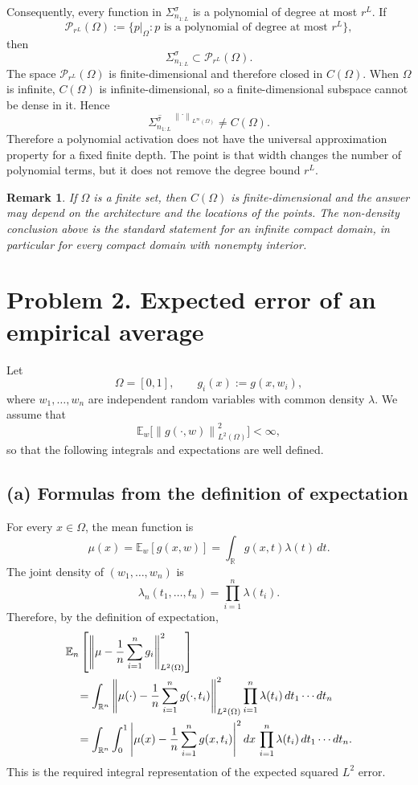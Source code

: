 \documentclass[11pt]{article}
\newtheorem*{remark}{Remark}
\newcommand{\R}{\mathbb{R}}
\newcommand{\E}{\mathbb{E}}
\newcommand{\norm}[1]{\left\lVert #1\right\rVert}
\begin{document}
Consequently, every function in $\Sigma_{n_{1:L}}^\sigma$ is a polynomial of
degree at most $r^L$. If
\[
  \mathcal P_{r^L}(\Omega)
  :=\{p|_\Omega:p\text{ is a polynomial of degree at most }r^L\},
\]
then
\[
  \Sigma_{n_{1:L}}^\sigma\subset \mathcal P_{r^L}(\Omega).
\]
The space $\mathcal P_{r^L}(\Omega)$ is finite-dimensional and therefore closed
in $C(\Omega)$. When $\Omega$ is infinite, $C(\Omega)$ is infinite-dimensional,
so a finite-dimensional subspace cannot be dense in it. Hence
\[
  \overline{\Sigma_{n_{1:L}}^\sigma}^{\,\norm{\cdot}_{L^\infty(\Omega)}}
  \ne C(\Omega).
\]
Therefore a polynomial activation does not have the universal approximation
property for a fixed finite depth. The point is that width changes the number
of polynomial terms, but it does not remove the degree bound $r^L$.

\begin{remark}
If $\Omega$ is a finite set, then $C(\Omega)$ is finite-dimensional and the
answer may depend on the architecture and the locations of the points. The
non-density conclusion above is the standard statement for an infinite compact
domain, in particular for every compact domain with nonempty interior.
\end{remark}

\section*{Problem 2. Expected error of an empirical average}

Let
\[
  \Omega=[0,1],
  \qquad
  g_i(x):=g(x,w_i),
\]
where $w_1,\ldots,w_n$ are independent random variables with common density
$\lambda$. We assume that
\[
  \E_w\bigl[\norm{g(\cdot,w)}_{L^2(\Omega)}^2\bigr]<\infty,
\]
so that the following integrals and expectations are well defined.

\subsection*{(a) Formulas from the definition of expectation}

For every $x\in\Omega$, the mean function is
\[
  \mu(x)
  =\E_w[g(x,w)]
  =\int_{\R}g(x,t)\lambda(t)\,dt.
\]
The joint density of $(w_1,\ldots,w_n)$ is
\[
  \lambda_n(t_1,\ldots,t_n)
  =\prod_{i=1}^n\lambda(t_i).
\]
Therefore, by the definition of expectation,
\begin{align*}
  &\E_n\left[
    \norm{\mu-{1\over n}\sum_{i=1}^n g_i}_{L^2(\Omega)}^2
  \right] \\
  &\quad=
  \int_{\R^n}
  \norm{
    \mu(\cdot)-{1\over n}\sum_{i=1}^n g(\cdot,t_i)
  }_{L^2(\Omega)}^2
  \prod_{i=1}^n\lambda(t_i)\,dt_1\cdots dt_n \\
  &\quad=
  \int_{\R^n}\int_0^1
  \left|
    \mu(x)-{1\over n}\sum_{i=1}^n g(x,t_i)
  \right|^2
  dx\,
  \prod_{i=1}^n\lambda(t_i)\,dt_1\cdots dt_n.
\end{align*}
This is the required integral representation of the expected squared
$L^2$ error.
\end{document}
